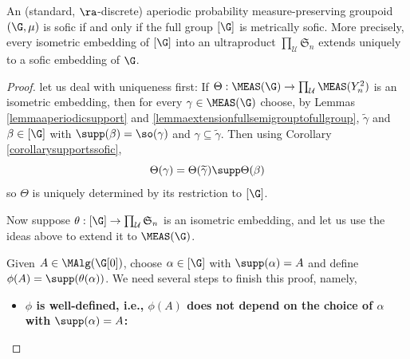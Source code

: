 \begin{theorem}\label{theoremfirstimportant}
An (standard, $\ra$-discrete) aperiodic probability measure-preserving groupoid $(\G,\mu)$ is sofic if and only if the full group $[\G]$ is metrically sofic. More precisely, every isometric embedding of $[\G]$ into an ultraproduct $\prod_\mathcal{U}\mathfrak{S}_n$ extends uniquely to a sofic embedding of $\G$.
\end{theorem}
\begin{proof}
let us deal with uniqueness first: If $\Theta:\MEAS(\G)\to\prod_\mathcal{U}\MEAS(Y_n^2)$ is an isometric embedding, then for every $\gamma\in\MEAS(\G)$ choose, by Lemmas \ref{lemmaaperiodicsupport} and \ref{lemmaextensionfullsemigrouptofullgroup}, $\widetilde{\gamma}$ and $\beta\in [\G]$ with $\supp(\beta)=\so(\gamma)$ and $\gamma\subseteq\widetilde{\gamma}$. Then using Corollary \ref{corollarysupportssofic},
\[\Theta(\gamma)=\Theta(\widetilde{\gamma})\supp\Theta(\beta)\]
 so $\Theta$ is uniquely determined by its restriction to $[\G]$.

Now suppose $\theta:[\G]\to\prod_\mathcal{U}\mathfrak{S}_n$ is an isometric embedding, and let us use the ideas above to extend it to $\MEAS(\G)$.

Given $A\in\MAlg(\G[0])$, choose $\alpha\in[\G]$ with $\supp(\alpha)=A$ and define $\phi(A)=\supp(\theta(\alpha))$. We need several steps to finish this proof, namely,

\begin{itemize}
\item[1.]{\bf$\phi$ is well-defined, i.e., $\phi(A)$ does not depend on the choice of $\alpha$ with $\supp(\alpha)=A$:}
\end{itemize}


\end{proof}
